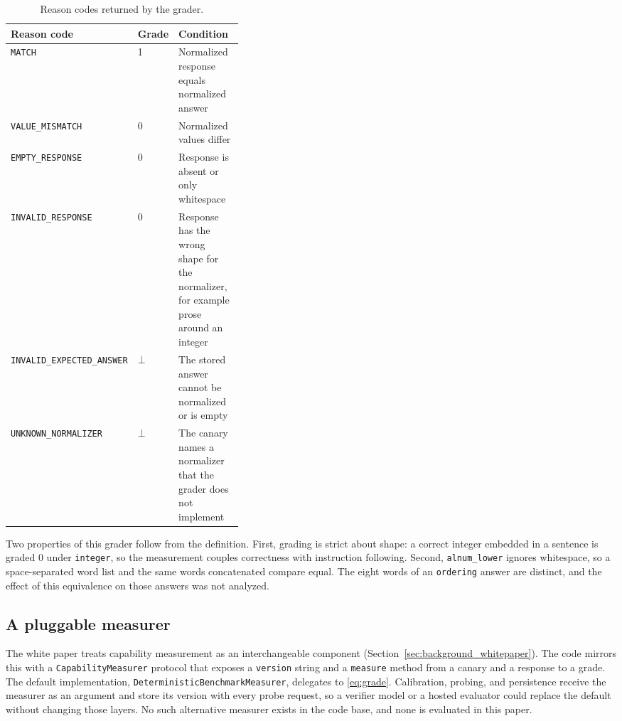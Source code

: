 \begin{table}[htbp]
  \centering
  \small
  \begin{tabularx}{\linewidth}{@{}p{0.3\linewidth}p{0.08\linewidth}X@{}}
    \toprule
    Reason code & Grade & Condition \\
    \midrule
    \texttt{MATCH} & 1 & Normalized response equals normalized answer \\
    \texttt{VALUE\_MISMATCH} & 0 & Normalized values differ \\
    \texttt{EMPTY\_RESPONSE} & 0 & Response is absent or only whitespace \\
    \texttt{INVALID\_RESPONSE} & 0 & Response has the wrong shape for the
      normalizer, for example prose around an integer \\
    \texttt{INVALID\_EXPECTED\_ANSWER} & $\bot$ & The stored answer cannot be
      normalized or is empty \\
    \texttt{UNKNOWN\_NORMALIZER} & $\bot$ & The canary names a normalizer that
      the grader does not implement \\
    \bottomrule
  \end{tabularx}
  \caption{Reason codes returned by the grader.}
  \label{tab:reasons}
\end{table}

Two properties of this grader follow from the definition. First, grading is
strict about shape: a correct integer embedded in a sentence is graded $0$
under \texttt{integer}, so the measurement couples correctness with
instruction following. Second, \texttt{alnum\_lower} ignores whitespace, so a
space-separated word list and the same words concatenated compare equal. The
eight words of an \texttt{ordering} answer are distinct, and the effect of this
equivalence on those answers was not analyzed.

\subsection{A pluggable measurer}
\label{sec:measurer}

The white paper treats capability measurement as an interchangeable component
(Section~\ref{sec:background_whitepaper}). The code mirrors this with a
\texttt{CapabilityMeasurer} protocol that exposes a \texttt{version} string and
a \texttt{measure} method from a canary and a response to a grade. The default
implementation, \texttt{DeterministicBenchmarkMeasurer}, delegates to
\eqref{eq:grade}. Calibration, probing, and persistence receive the measurer as
an argument and store its version with every probe request, so a verifier model
or a hosted evaluator could replace the default without changing those layers.
No such alternative measurer exists in the code base, and none is evaluated in
this paper.
